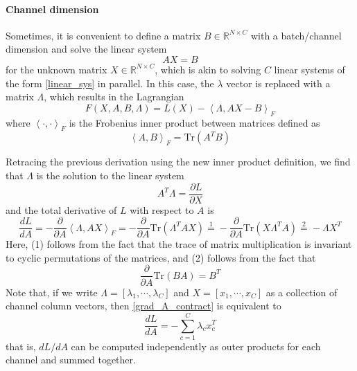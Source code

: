 \documentclass[11pt, a4paper]{article}
\begin{document}
\paragraph{Channel dimension}
Sometimes, it is convenient to define a matrix $B\in \mathbb R^{N\times C}$ with a batch/channel dimension and solve the linear system
\begin{equation}
    AX=B
\end{equation}
for the unknown matrix $X\in\mathbb R^{N\times C}$, which is akin to solving $C$ linear systems of the form \eqref{linear_sys} in parallel. In this case, the $\lambda$ vector is replaced with a matrix $\Lambda$, which results in the Lagrangian
\begin{equation}
    F(X, A, B, \Lambda) = L(X) - \left<\Lambda, AX-B\right>_F
\end{equation}
where $\left<\cdot, \cdot\right>_F$ is the Frobenius inner product between matrices defined as
\begin{equation}
    \left<A, B\right>_F = \text{Tr}(A^T B)
\end{equation}

Retracing the previous derivation using the new inner product definition, we find that $\Lambda$ is the solution to the linear system
\begin{equation}
    A^T\Lambda = \frac{\partial L}{\partial X}
\end{equation}
and the total derivative of $L$ with respect to $A$ is
\begin{equation}
    \frac{dL}{dA} = -\frac{\partial}{\partial A}\left<\Lambda, AX\right>_F = -\frac{\partial}{\partial A}\text{Tr}\left(\Lambda^TAX\right) \overset{1}{=} -\frac{\partial}{\partial A}\text{Tr}\left(X\Lambda^TA\right) \overset{2}{=} -\Lambda X^T \label{grad_A_contract}
\end{equation}
Here, (1) follows from the fact that the trace of matrix multiplication is invariant to cyclic permutations of the matrices, and (2) follows from the fact that
\begin{equation}
    \frac{\partial}{\partial A}\text{Tr}(BA) = B^T
\end{equation}
Note that, if we write $\Lambda = [\lambda_1, \cdots, \lambda_C]$ and $X = [x_1, \cdots, x_C]$ as a collection of channel column vectors, then \eqref{grad_A_contract} is equivalent to
\begin{equation}
    \frac{dL}{dA} = -\sum_{c=1}^C \lambda_c x_c^T
\end{equation}
that is, $dL/dA$ can be computed independently as outer products for each channel and summed together.
\end{document}
